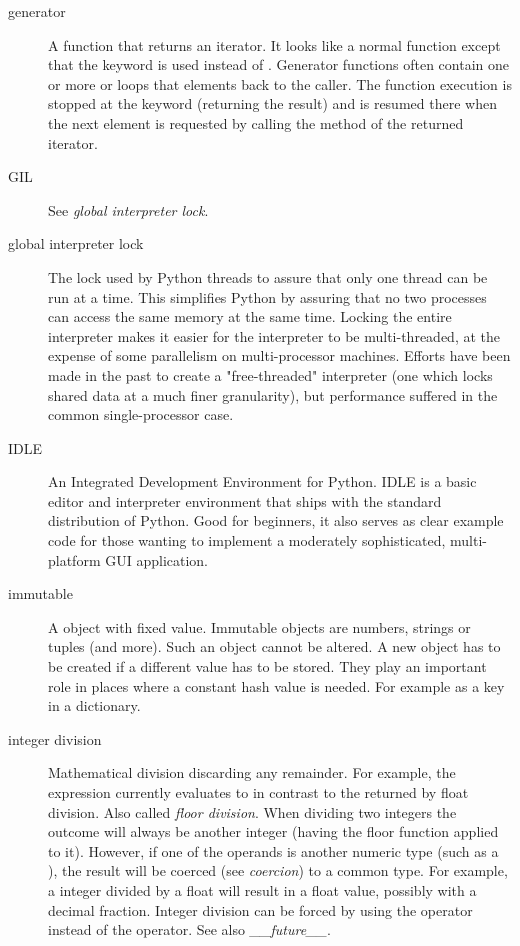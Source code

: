 \begin{description}
\item[generator]
A function that returns an iterator.  It looks like a normal function
except that the  keyword is used instead of
{}.  Generator functions often contain one or more
{} or  loops that  elements
back to the caller.  The function execution is stopped at the
{} keyword (returning the result) and is resumed there
when the next element is requested by calling the 
method of the returned iterator.

\item[GIL]
See \emph{global interpreter lock}.

\item[global interpreter lock]
The lock used by Python threads to assure that only one thread can be
run at a time.  This simplifies Python by assuring that no two
processes can access the same memory at the same time.  Locking the
entire interpreter makes it easier for the interpreter to be
multi-threaded, at the expense of some parallelism on multi-processor
machines.  Efforts have been made in the past to create a
"free-threaded" interpreter (one which locks shared data at a much
finer granularity), but performance suffered in the common
single-processor case.

\item[IDLE]
An Integrated Development Environment for Python.  IDLE is a
basic editor and interpreter environment that ships with the standard
distribution of Python.  Good for beginners, it also serves as clear
example code for those wanting to implement a moderately
sophisticated, multi-platform GUI application.

\item[immutable]
A object with fixed value.  Immutable objects are numbers, strings or
tuples (and more).  Such an object cannot be altered.  A new object
has to be created if a different value has to be stored.  They play an
important role in places where a constant hash value is needed.  For
example as a key in a dictionary.

\item[integer division]
Mathematical division discarding any remainder.  For example, the
expression  currently evaluates to  in contrast
to the  returned by float division.  Also called
{}\emph{floor division}.  When dividing two integers the outcome will
always be another integer (having the floor function applied to it).
However, if one of the operands is another numeric type (such as a
{}), the result will be coerced (see \emph{coercion}) to
a common type.  For example, a integer divided by a float will result
in a float value, possibly with a decimal fraction.  Integer division
can be forced by using the \code{//} operator instead of the \code{/}
operator.  See also \emph{__future__}.


\end{description}
